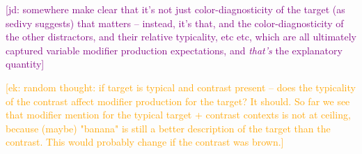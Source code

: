 \documentclass[10pt,letterpaper]{article}
\newcommand{\ek}[1]{\textcolor{Orange}{[ek: #1]}}
\newcommand{\jd}[1]{\textcolor{Purple}{[jd: #1]}}
\begin{document}
\jd{somewhere make clear that it's not just color-diagnosticity of the target (as sedivy suggests) that matters -- instead, it's that, and the color-diagnosticity of the other distractors, and their relative typicality, etc etc, which are all ultimately captured variable modifier production expectations, and \emph{that's} the explanatory quantity}

\ek{random thought: if target is typical and contrast present -- does the typicality of the contrast affect modifier production for the target? It should. So far we see that modifier mention for the typical target + contrast contexts is not at ceiling, because (maybe) "banana" is still a better description of the target than the contrast. This would probably change if the contrast was brown.}


\end{document}
